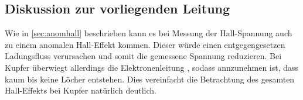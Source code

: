 \subsection{Diskussion zur vorliegenden Leitung}


%
%

Wie in \ref{sec:anomhall} beschrieben kann es bei Messung der Hall-Spannung auch zu einem anomalen Hall-Effekt kommen.
Dieser würde einen entgegengesetzen Ladungsfluss verursachen und somit die gemessene Spannung reduzieren.
Bei Kupfer überwiegt allerdings die Elektronenleitung \cite[8]{V311.pdf}, sodass annzunehmen ist, dass kaum bis keine Löcher entstehen.
Dies vereinfacht die Betrachtung des gesamten Hall-Effekts bei Kupfer natürlich deutlich.
